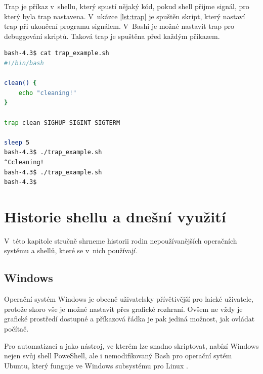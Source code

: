 \documentclass[thesis=M,czech]{FITthesis}[2012/06/26]
\begin{document}

Trap je příkaz v~shellu, který spustí nějaký kód, pokud shell přijme signál, pro který byla trap nastavena. V~ukázce \ref{lst:trap} je spuštěn skript, který nastaví trap při ukončení programu signálem. V~Bashi je možné nastavit trap pro debuggování skriptů. Taková trap je spuštěna před každým příkazem.

\begin{minipage}{\linewidth}
\begin{lstlisting}[language=bash, caption={Ukázka trap v~shellu Bash}, label={lst:trap}]
bash-4.3$ cat trap_example.sh
#!/bin/bash

clean() {
	echo "cleaning!"
}

trap clean SIGHUP SIGINT SIGTERM

sleep 5
bash-4.3$ ./trap_example.sh
^Ccleaning!
bash-4.3$ ./trap_example.sh
bash-4.3$
\end{lstlisting}
\end{minipage}

%
\chapter{Historie shellu a dnešní využití}

V~této kapitole stručně shrneme historii rodin nepoužívanějších operačních systému a shellů, které se v~nich používají.


%
\section{Windows}

Operační systém Windows \cite{windows} je obecně uživatelsky přívětivější pro laické uživatele, protože skoro vše je možné nastavit přes grafické rozhraní. Ovšem ne vždy je grafické prostředí dostupné a příkazová řádka je pak jediná možnost, jak ovládat počítač.

Pro automatizaci a jako nástroj, ve kterém lze snadno skriptovat, nabízí Windows nejen svůj shell PoweShell, ale i nemodifikovaný Bash pro operační sytém Ubuntu, který funguje ve Windows subsystému pro Linux \cite{windowscmd}.

\end{document}
